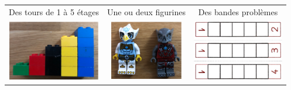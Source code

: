 \begin{exercice*}
\begin{center}
   \begin{tabular}{C{4.5}|C{4.5}|C{4.5}}
      Des tours de 1 à 5 étages & Une ou deux figurines & Des bandes problèmes \\
      \includegraphics[width=4cm]{Geometrie_did/Images/Geo6_activites_tours7}
      &
      \includegraphics[width=3.2cm]{Geometrie_did/Images/Geo6_activites_tours8}
      &
      \includegraphics[width=4cm]{Geometrie_did/Images/Geo6_activites_tours9}
      \\
   \end{tabular} \\
\end{center}


\end{exercice*}
